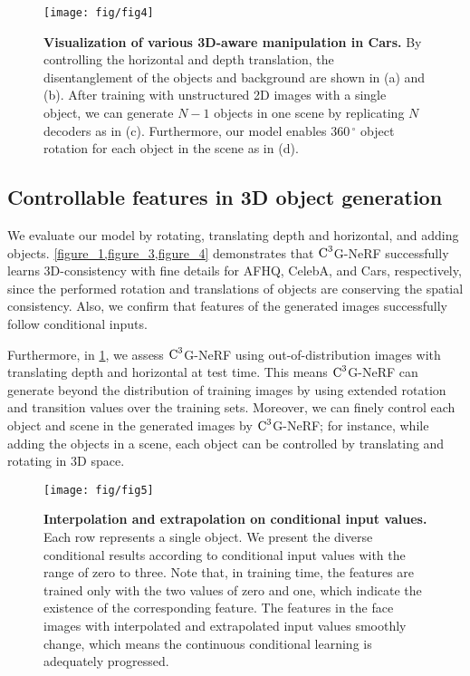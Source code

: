\documentclass[nohyperref]{article}
\theoremstyle{plain}
\theoremstyle{definition}
\theoremstyle{remark}
\begin{document}
\begin{figure}[t]
\begin{center}
\centerline{\texttt{[image: fig/fig4]}}
\vskip -0.1in
\caption{\textbf{Visualization of various 3D-aware manipulation in Cars.} By controlling the horizontal and depth translation, the disentanglement of the objects and background are shown in (a) and (b). After training with unstructured 2D images with a single object, we can generate $N-1$ objects in one scene by replicating $N$ decoders as in (c). Furthermore, our model enables $360\,^{\circ}$ object rotation for each object in the scene as in (d).}
\label{figure_4}
\end{center}
\vskip -0.3in
\end{figure}





\subsection{Controllable features in 3D object generation}
We evaluate our model by rotating, translating depth and horizontal, and adding objects. \cref{figure_1,figure_3,figure_4} demonstrates that $\textnormal{C}^{3}$G-NeRF successfully learns 3D-consistency with fine details for AFHQ, CelebA, and Cars, respectively, since the performed rotation and translations of objects are conserving the spatial consistency. Also, we confirm that features of the generated images successfully follow conditional inputs.

Furthermore, in \cref{figure_4}, we assess $\textnormal{C}^{3}$G-NeRF using out-of-distribution images with translating depth and horizontal at test time. This means $\textnormal{C}^{3}$G-NeRF can generate beyond the distribution of training images by using extended rotation and transition values over the training sets. Moreover, we can finely control each object and scene in the generated images by $\textnormal{C}^{3}$G-NeRF; for instance, while adding the objects in a scene, each object can be controlled by translating and rotating in 3D space.



\begin{figure}[h]
\begin{center}
\centerline{\texttt{[image: fig/fig5]}}
\vskip -0.1in
\caption{\textbf{Interpolation and extrapolation on conditional input values.} Each row represents a single object. We present the diverse conditional results according to conditional input values with the range of zero to three. Note that, in training time, the features are trained only with the two values of zero and one, which indicate the existence of the corresponding feature. The features in the face images with interpolated and extrapolated input values smoothly change, which means the continuous conditional learning is adequately progressed.}
\label{figure_5}
\end{center}
\vskip -0.4in
\end{figure}
\end{document}
